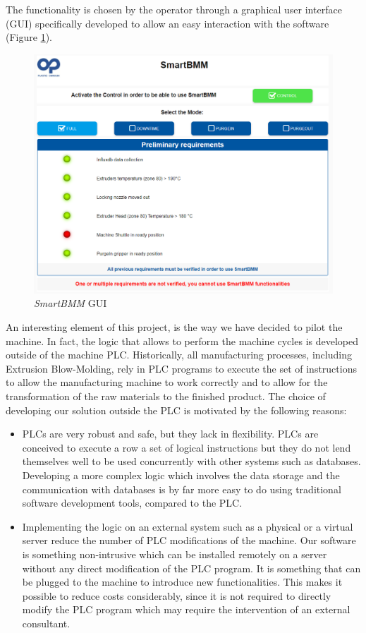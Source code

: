 The functionality is chosen by the operator through a graphical user interface (GUI) specifically developed to allow an easy interaction with the software (Figure \ref{fig:SmartBMM_gui}).
%
\begin{figure}
\centerline{\includegraphics[scale=0.5]{images/chapter_3/SmartBMM_gui.png}}
\caption{\textit{SmartBMM} GUI}
\label{fig:SmartBMM_gui}
\end{figure}
%
An interesting element of this project, is the way we have decided to pilot the machine. In fact, the logic that allows to perform the machine cycles is developed outside of the machine PLC. Historically, all manufacturing processes, including Extrusion Blow-Molding, rely in PLC programs to execute the set of instructions to allow the manufacturing machine to work correctly and to allow for the transformation of the raw materials to the finished product. The choice of developing our solution outside the PLC is motivated by the following reasons:
%
\begin{itemize}
    \item PLCs are very robust and safe, but they lack in flexibility. PLCs are conceived to execute a row a set of logical instructions but they do not lend themselves well to be used concurrently with other systems such as databases. Developing a more complex logic which involves the data storage and the communication with databases is by far more easy to do using traditional software development tools, compared to the PLC.
    \item Implementing the logic on an external system such as a physical or a virtual server reduce the number of PLC modifications of the machine. Our software is something non-intrusive which can be installed remotely on a server without any direct modification of the PLC program. It is something that can be plugged to the machine to introduce new functionalities. This makes it possible to reduce costs considerably, since it is not required to directly modify the PLC program which may require the intervention of an external consultant.
\end{itemize}
